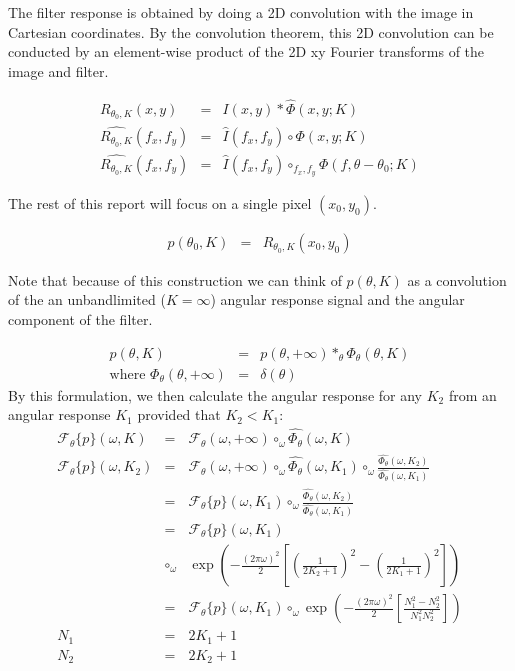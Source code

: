 \documentclass{article}
\begin{document}
The filter response is obtained by doing a 2D convolution with the image in Cartesian coordinates. By the convolution theorem, this 2D convolution can be conducted by an element-wise product of the 2D xy Fourier transforms of the image and filter.

\begin{eqnarray}
    R_{\theta_0,K}(x,y) & = & I(x,y) \ast \hat{\Phi}(x,y; K) \\
    \widehat{R_{\theta_0,K}}(f_x,f_y) & = & \hat{I}(f_x,f_y) \circ \Phi(x,y; K) \\
    \widehat{R_{\theta_0,K}}(f_x,f_y) & = & \hat{I}(f_x,f_y) \circ_{f_x,f_y} \Phi(f,\theta-\theta_0; K)
\end{eqnarray}

The rest of this report will focus on a single pixel $ (x_0,y_0) $.

\begin{eqnarray}
    p(\theta_0,K) & = & R_{\theta_0,K}(x_0,y_0)
\end{eqnarray}

Note that because of this construction we can think of $ p(\theta,K) $ as a convolution of the an unbandlimited ($K = \infty $) angular response signal and the angular component of the filter.

\begin{eqnarray}
    p(\theta,K) & = & p(\theta,+\infty) \ast_\theta \Phi_\theta(\theta,K) \\
    \mbox{where } \Phi_\theta(\theta,+\infty) & = & \delta({\theta}) 
\end{eqnarray}
By this formulation, we then calculate the angular response for any $ K_2 $ from an angular response $ K_1 $ provided that $ K_2 < K_1 $:
\begin{eqnarray}
    \mathcal{F}_\theta\{ p \}(\omega,K) & = & \mathcal{F}_\theta(\omega,+\infty) \circ_\omega \widehat{\Phi_\theta}(\omega,K) \\
    \mathcal{F}_\theta\{ p \}(\omega,K_2) & = & \mathcal{F}_\theta(\omega,+\infty) \circ_\omega \widehat{\Phi_\theta}(\omega,K_1) \circ_\omega \frac{ \widehat{\Phi_\theta}(\omega,K_2) }{ \widehat{\Phi_\theta}(\omega,K_1)  } \\
    & = &  \mathcal{F}_\theta\{ p \}(\omega,K_1) \circ_\omega \frac{ \widehat{\Phi_\theta}(\omega,K_2) }{ \widehat{\Phi_\theta}(\omega,K_1)  } \\
    & = & \mathcal{F}_\theta\{ p \}(\omega,K_1) \nonumber\\ 
    & \circ_\omega & \exp\left(- \frac{(2\pi\omega)^2}{2}  \left[ \left(\frac{1}{2K_2+1}\right)^2 - \left(\frac{1}{2K_1+1}\right)^2 \right] \right) \label{eqn:phi_k2_k1} \\
    & = & \mathcal{F}_\theta\{ p \}(\omega,K_1)
    \circ_\omega   \exp\left(- \frac{(2\pi\omega)^2}{2}  \left[ \frac{N_1^2 - N_2^2}{N_1^2 N_2^2} \right] \right) \\
    N_1 & = & 2K_1 + 1 \\
    N_2 & = & 2K_2 + 1 
\end{eqnarray}
\end{document}
